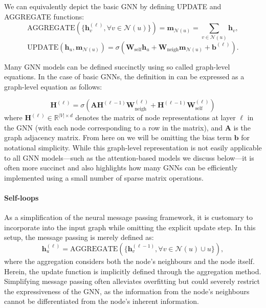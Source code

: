 We can equivalently depict the basic GNN by defining UPDATE and AGGREGATE functions:
\begin{equation}\label{eq:aggregateBase}
    \text{AGGREGATE}(\{\mathbf{h}_v^{(\ell)}, \forall v \in \mathcal{N}(u)\}) =
    \mathbf{m}_{\mathcal{N}(u)} = \sum_{v\in\mathcal{N}(u)}\mathbf{h}_v,
\end{equation}
\begin{equation}\label{eq:updateBase}
    \text{UPDATE}(\mathbf{h}_u, \mathbf{m}_{\mathcal{N}(u)}) = \sigma(\mathbf{W}_\text{self}\mathbf{h}_u + \mathbf{W}_\text{neigh}\mathbf{m}_{\mathcal{N}(u)} + \mathbf{b}^{(\ell)}).
\end{equation}

Many GNN models can be defined succinctly using so called graph-level equations. In the case of basic GNNs, the definition in  can be expressed as a graph-level equation as follows:

\begin{equation}\label{eq:basicGNNgraphlevel}
    \mathbf{H}^{(\ell)} = \sigma\left(\mathbf{A}\mathbf{H}^{(\ell-1)}\mathbf{W}_\text{neigh}^{(\ell)} + \mathbf{H}^{(\ell-1)}\mathbf{W}_\text{self}^{(\ell)}\right)
\end{equation}
where $\mathbf{H}^{(\ell)} \in \mathbb{R}^{|V| \times d}$ denotes the matrix of node representations at layer $\ell$ in the GNN (with each node corresponding to a row in the matrix), and $\mathbf{A}$ is the graph adjacency matrix. From here on we will be omitting the bias term $\mathbf{b}$ for notational simplicity. While this graph-level representation is not easily applicable to all GNN models—such as the attention-based models we discuss below—it is often more succinct and also highlights how many GNNs can be efficiently implemented using a small number of sparse matrix operations.


\paragraph{Self-loops}
As a simplification of the neural message passing framework, it is customary to incorporate  into the input graph while omitting the explicit update step. In this setup, the message passing is merely defined as:
\begin{equation}\label{eq:selfLoop}
    \mathbf{h}_u^{(\ell)} = \text{AGGREGATE}(\{\mathbf{h}_v^{(\ell-1)}, \forall v \in \mathcal{N}(u)\cup {u}\}),
\end{equation}
where the aggregation considers both the node's neighbours and the node itself. Herein, the update function is implicitly defined through the aggregation method. Simplifying message passing often alleviates overfitting but could severely restrict the expressiveness of the GNN, as the information from the node's neighbours cannot be differentiated from the node's inherent information.

